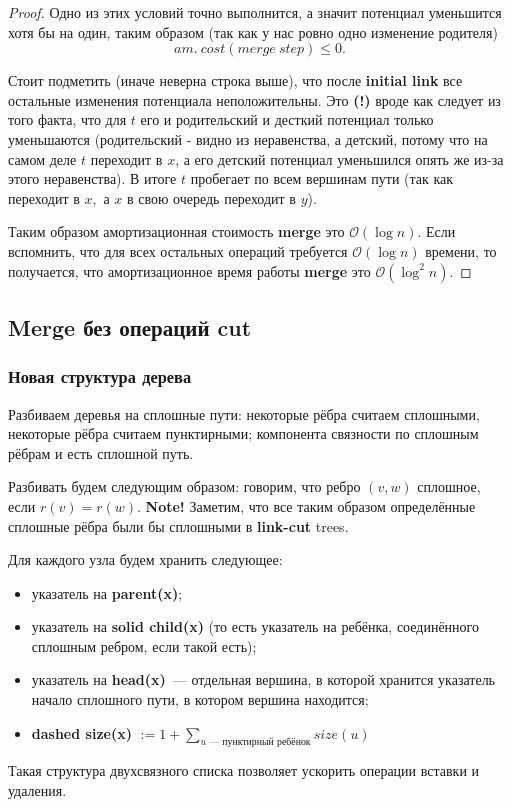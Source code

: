 \begin{proof}
Одно из этих условий точно выполнится, а значит потенциал уменьшится хотя бы на один, таким образом (так как у нас ровно одно изменение родителя) 
$$am.\: cost(merge\:step) \leqslant 0.$$

Стоит подметить (иначе неверна строка выше), что после \textbf{initial link} все остальные изменения потенциала неположительны. Это \textbf{(!)} вроде как следует из того факта, что для $t$ его и родительский и десткий потенциал только уменьшаются (родительский - видно из неравенства, а детский, потому что на самом деле $t$ переходит в $x$, а его детский потенциал уменьшился опять же из-за этого неравенства). В итоге $t$ пробегает по всем вершинам пути (так как переходит в $x,$ а $x$ в свою очередь переходит в $y$).

Таким образом амортизационная стоимость \textbf{merge} это $\mathcal{O}(\log{n}).$ Если вспомнить, что для всех остальных операций требуется $\mathcal{O}(\log{n})$ времени, то получается, что амортизационное время работы \textbf{merge} это $\mathcal{O}(\log^2{n}).$
\end{proof}
\subsection{Merge без операций cut}
\subsubsection{Новая структура дерева}
Разбиваем деревья на сплошные пути: некоторые рёбра считаем сплошными, некоторые рёбра считаем пунктирными; компонента связности по сплошным рёбрам и есть сплошной путь.



Разбивать будем следующим образом: говорим, что ребро $(v, w)$ сплошное, если $r(v) = r(w).$ \textbf{Note!} Заметим, что все таким образом определённые сплошные рёбра были бы сплошными в \textbf{link-cut} trees.

Для каждого узла будем хранить следующее:
\begin{itemize}
    \item указатель на \textbf{parent(x)};
    \item указатель на \textbf{solid child(x)} (то есть указатель на ребёнка, соединённого сплошным ребром, если такой есть);
    \item указатель на \textbf{head(x)}~--- отдельная вершина, в которой хранится указатель начало сплошного пути, в котором вершина находится;
    \item \textbf{dashed size(x)} $:= 1 + \sum\limits_{u \text{~--- пунктирный ребёнок}}size(u)$
\end{itemize}
Такая структура двухсвязного списка позволяет ускорить операции вставки и удаления.

